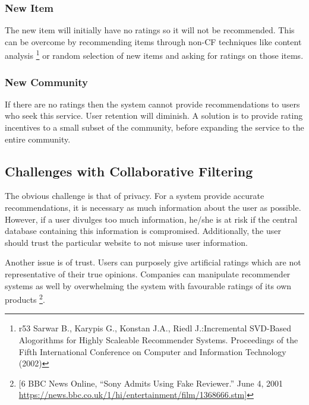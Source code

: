 \subsubsection{New Item }
The new item will initially have no ratings so it will not be recommended. This can be overcome by recommending items through non-CF techniques like content analysis \footnote{r53 Sarwar B., Karypis G., Konstan J.A., Riedl J.:Incremental SVD-Based Alogorithms for Highly Scaleable Recommender Systems. Proceedings of the Fifth International Conference on Computer and Information Technology (2002)} or random selection of new items and asking for ratings on those items.

\subsubsection{New Community}
If there are no ratings then the system cannot provide recommendations to users who seek this service. User retention will diminish. A solution is to provide rating incentives to a small subset of the community, before expanding the service to the entire community. 

\subsection{Challenges with Collaborative Filtering}

The obvious challenge is that of privacy. For a system provide accurate recommendations, it is necessary as much information about the user as possible. However, if a user divulges too much information, he/she is at risk if the central database containing this information is compromised. Additionally, the user should trust the particular website to not misuse user information.

Another issue is of trust. Users can purposely give artificial ratings which are not representative of their true opinions. Companies can manipulate recommender systems as well by overwhelming the system with favourable ratings of its own products \footnote{[6 BBC News Online, ``Sony Admits Using Fake Reviewer.'' June 4, 2001 \url{https://news.bbc.co.uk/1/hi/entertainment/film/1368666.stm}]}.
